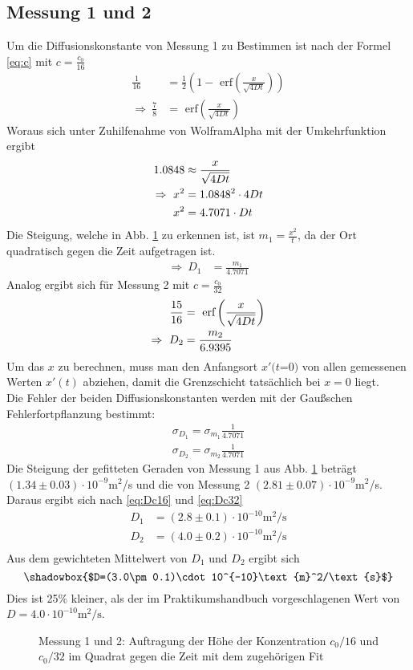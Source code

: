 \documentclass[12pt,a4paper,titlepage,headinclude,bibtotoc]{scrartcl}
\newcommand{\erf}[1]{\text{ erf}\ensuremath{\left( #1 \right)}}
\begin{document}
\subsection{Messung 1 und 2}
Um die Diffusionskonstante von Messung 1 zu Bestimmen ist nach der Formel \eqref{eq:c} mit $c=\frac{c_0}{16}$
\begin{align*}
 \frac{1}{16}&=\frac{1}{2}\left(1-\erf{\frac{x}{\sqrt{4Dt}}}\right)\\
 \Rightarrow~ \frac{7}{8}&=\erf{\frac{x}{\sqrt{4Dt}}}
\end{align*}Woraus sich unter Zuhilfenahme von WolframAlpha\textsuperscript{\textregistered} mit der Umkehrfunktion ergibt
\begin{align*}
 1.0848&\approx \frac{x}{\sqrt{4Dt}}\notag\\
 \Rightarrow~ x^2&=1.0848^2 \cdot 4Dt\notag\\
 x^2&=4.7071\cdot Dt\notag
\end{align*}
Die Steigung, welche in Abb. \ref{fig:M12} zu erkennen ist, ist $m_1=\frac{x^2}{t}$, da der Ort quadratisch gegen die Zeit aufgetragen ist.
\begin{align}
\Rightarrow ~D_1&=\frac{m_1}{4.7071}\label{eq:Dc16}
\end{align}
Analog ergibt sich für Messung 2 mit $c=\frac{c_0}{32}$
\begin{align}
 \frac{15}{16}&=\erf{\frac{x}{\sqrt{4Dt}}}\notag\\
 \Rightarrow~ D_2&=\frac{m_2}{6.9395}\label{eq:Dc32}
\end{align}
Um das $x$ zu berechnen, muss man den Anfangsort $x'(t$=$0)$ von allen gemessenen Werten $x'(t)$ abziehen, damit die Grenzschicht tatsächlich bei $x=0$ liegt.\\  
Die Fehler der beiden Diffusionskonstanten werden mit der Gaußschen Fehlerfortpflanzung bestimmt:
\begin{align*}
 \sigma_{D_1}= \sigma_{m_1}\frac{1}{4.7071}\\
 \sigma_{D_2}= \sigma_{m_2}\frac{1}{4.7071}
\end{align*}
Die Steigung der gefitteten Geraden von Messung 1 aus Abb. \ref{fig:M12} beträgt $(1.34\pm 0.03)\cdot 10^{-9}$m$^2$/s und die von Messung 2 $(2.81\pm 0.07)\cdot 10^{-9}$m$^2$/s.
Daraus ergibt sich nach \eqref{eq:Dc16} und \eqref{eq:Dc32}
\begin{align*}
 D_1&= (2.8\pm 0.1)\cdot 10^{-10}\text{m}^2/\text{s}\\
 D_2&= (4.0\pm 0.2)\cdot 10^{-10}\text{m}^2/\text{s}\\
\end{align*}
Aus dem gewichteten Mittelwert von $D_1$ und $D_2$ ergibt sich 
$$\shadowbox{$D=(3.0\pm 0.1)\cdot 10^{-10}\text{m}^2/\text{s}$}$$
 Dies ist 25\% kleiner, als der im Praktikumshandbuch vorgeschlagenen Wert von $D=4.0\cdot 10^{-10}\text{m}^2/\text{s}$.
\begin{figure}[!h]
\centering

\caption{Messung 1 und 2: Auftragung der Höhe der Konzentration $c_0/16$ und $c_0/32$ im Quadrat gegen die Zeit mit dem zugehörigen Fit\label{fig:M12}}
\end{figure}
\end{document}
